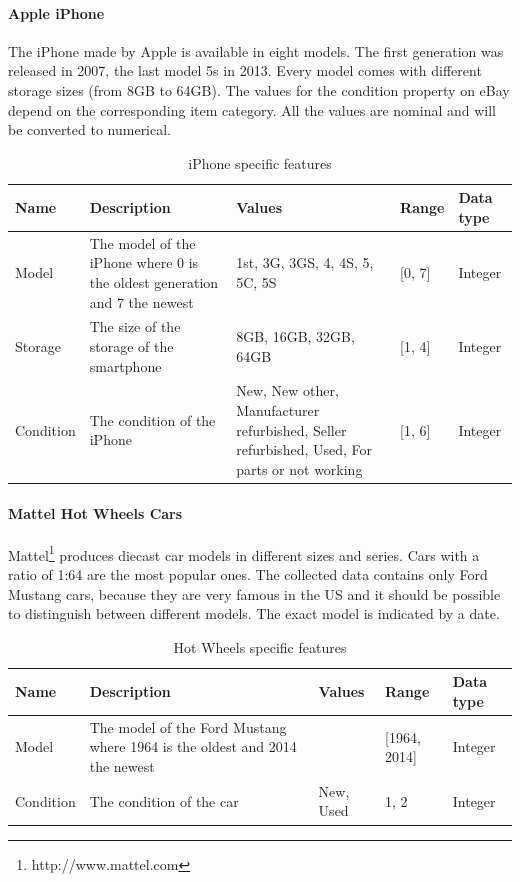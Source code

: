 \paragraph{Apple iPhone}
The iPhone made by Apple is available in eight models. The first generation was released in 2007, the last model 5s in 2013. Every model comes with different storage sizes (from 8GB to 64GB). The values for the condition property on eBay depend on the corresponding item category. All the values are nominal and will be converted to numerical.
\begin{table}[h!]
	\begin{center}
	\begin{tabular}{| p{2.6cm} | p{2.6cm} | p{2.6cm} | p{2.6cm} | p{2.6cm} |}
		\hline
		Name & Description & Values & Range & Data type \\
		\hline
		Model & The model of the iPhone where 0 is the oldest generation and 7 the newest & 1st, 3G, 3GS, 4, 4S, 5, 5C, 5S & [0, 7] & Integer \\
		\hline
		Storage & The size of the storage of the smartphone & 8GB, 16GB, 32GB, 64GB & [1, 4] & Integer \\
		\hline
		Condition & The condition of the iPhone & New, New other, Manufacturer refurbished, Seller refurbished, Used, For parts or not working & [1, 6] & Integer \\
		\hline
	\end{tabular}
	\end{center}
	\caption{iPhone specific features}
\end{table}

\paragraph{Mattel Hot Wheels Cars}
Mattel\footnote{http://www.mattel.com} produces diecast car models in different sizes and series. Cars with a ratio of 1:64 are the most popular ones. The collected data contains only Ford Mustang cars, because they are very famous in the US and it should be possible to distinguish between different models. The exact model is indicated by a date.
\begin{table}[h!]
	\begin{center}
	\begin{tabular}{| p{2.6cm} | p{2.6cm} | p{2.6cm} | p{2.6cm} | p{2.6cm} |}
		\hline
		Name & Description & Values & Range & Data type \\
		\hline
		Model & The model of the Ford Mustang where 1964 is the oldest and 2014 the newest & & [1964, 2014] & Integer \\
		\hline
		Condition & The condition of the car & New, Used & {1, 2} & Integer \\
		\hline
	\end{tabular}
	\end{center}
	\caption{Hot Wheels specific features}
\end{table}

